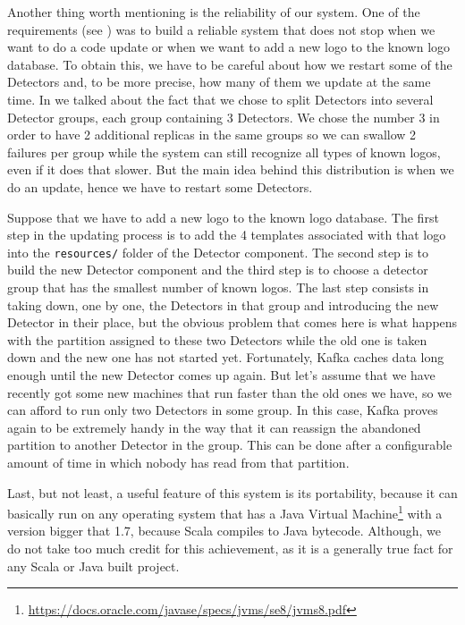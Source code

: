 Another thing worth mentioning is the reliability of our system. One of the
requirements (see ) was to build a
reliable system that does not stop when we want to do a code update or when we
want to add a new logo to the known logo database. To obtain this, we have to
be careful about how we restart some of the Detectors and, to be more precise,
how many of them we update at the same time. In
 we talked about the fact that we
chose to split Detectors into several Detector groups, each group containing 3
Detectors. We chose the number 3 in order to have 2 additional replicas in the same
groups so we can swallow 2 failures per group while the system can still recognize
all types of known logos, even if it does that slower. But the main idea behind
this distribution is when we do an update, hence we have to restart some
Detectors.

Suppose that we have to add a new logo to the known logo database. The first
step in the updating process is to add the 4 templates associated with that
logo into the \texttt{resources/} folder of the Detector component. The second
step is to build the new Detector component and the third step is to choose a
detector group that has the smallest number of known logos. The last step
consists in taking down, one by one, the Detectors in that group and
introducing the new Detector in their place, but the obvious problem that
comes here is what happens with the partition assigned to these two Detectors
while the old one is taken down and the new one has not started yet.
Fortunately, Kafka caches data long enough until the new Detector comes up
again. But let's assume that we have recently got some new machines that run
faster than the old ones we have, so we can afford to run only two Detectors
in some group. In this case, Kafka proves again to be extremely handy in the
way that it can reassign the abandoned partition to another Detector in the
group. This can be done after a configurable amount of time in which nobody
has read from that partition.

Last, but not least, a useful feature of this system is its portability,
because it can basically run on any operating system that has a Java Virtual
Machine\footnote{\url{https://docs.oracle.com/javase/specs/jvms/se8/jvms8.pdf}}
with a version bigger that 1.7, because Scala compiles to Java bytecode. Although,
we do not take too much credit for this achievement, as it is a generally true
fact for any Scala or Java built project.
